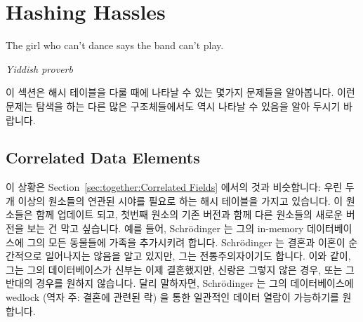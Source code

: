 
\section{Hashing Hassles}
\label{sec:together:Hashing Hassles}
%
\epigraph{The girl who can't dance says the band can't play.}
	 {\emph{Yiddish proverb}}

이 섹션은 해시 테이블을 다룰 때에 나타날 수 있는 몇가지 문제들을 알아봅니다.
이런 문제는 탐색을 하는 다른 많은 구조체들에서도 역시 나타날 수 있음을 알아
두시기 바랍니다.
\iffalse

This section looks at some issues that can arise when dealing with
hash tables.
Please note that these issues also apply to many other search structures.
\fi

\subsection{Correlated Data Elements}
\label{sec:together:Correlated Data Elements}

이 상황은
Section~\ref{sec:together:Correlated Fields} 에서의 것과 비슷합니다:
우린 두개 이상의 원소들의 연관된 시야를 필요로 하는 해시 테이블을 가지고
있습니다.
이 원소들은 함께 업데이트 되고, 첫번째 원소의 기존 버전과 함께 다른 원소들의
새로운 버전을 보는 건 막고 싶습니다.
예를 들어, Schr\"odinger 는 그의 in-memory 데이터베이스에 그의 모든 동물들에
가족을 추가시키려 합니다.
Schr\"odinger 는 결혼과 이혼이 순간적으로 일어나지는 않음을 알고 있지만, 그는
전통주의자이기도 합니다.
이와 같이, 그는 그의 데이터베이스가 신부는 이제 결혼했지만, 신랑은 그렇지 않은
경우, 또는 그 반대의 경우를 원하지 않습니다.
달리 말하자면, Schr\"odinger 는 그의 데이터베이스에 wedlock (역자 주: 결혼에
관련된 락) 을 통한 일관적인 데이터 열람이 가능하기를 원합니다.
\iffalse

This situation is analogous to that in
Section~\ref{sec:together:Correlated Fields}:
We have a hash table where we need correlated views of two or more of
the elements.
These elements are updated together, and we do not want to see an old
version of the first element along with new versions of the other
elements.
For example, Schr\"odinger decided to add his extended family to his
in-memory database along with all his animals.
Although Schr\"odinger understands that marriages and divorces do not
happen instantaneously, he is also a traditionalist.
As such, he absolutely does not want his database ever to show that the
bride is now married, but the groom is not, and vice versa.
In other words, Schr\"odinger wants to be able to carry out a
wedlock-consistent traversal of his database.
\fi

